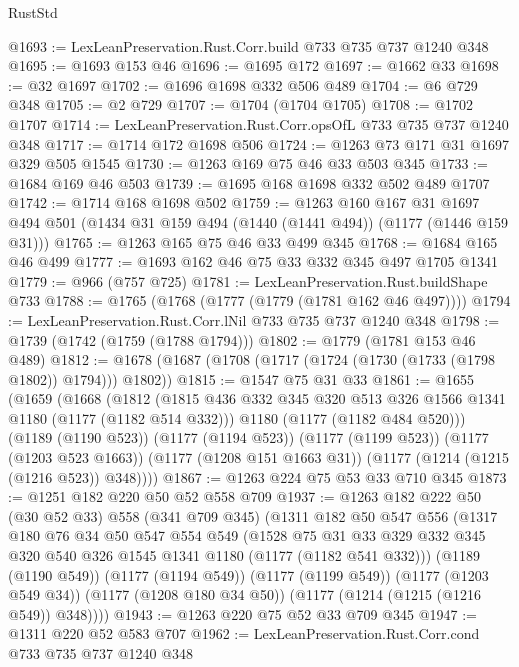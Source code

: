 \begin{lexlean}{RustStd}
\begin{coremodule}
@1693 := LexLeanPreservation.Rust.Corr.build @733 @735 @737 @1240 @348
@1695 := @1693 @153 @46
@1696 := @1695 @172
@1697 := @1662 @33
@1698 := @32 @1697
@1702 := @1696 @1698 @332 @506 @489
@1704 := @6 @729 @348
@1705 := @2 @729
@1707 := @1704 (@1704 @1705)
@1708 := @1702 @1707
@1714 := LexLeanPreservation.Rust.Corr.opsOfL @733 @735 @737 @1240 @348
@1717 := @1714 @172 @1698 @506
@1724 := @1263 @73 @171 @31 @1697 @329 @505 @1545
@1730 := @1263 @169 @75 @46 @33 @503 @345
@1733 := @1684 @169 @46 @503
@1739 := @1695 @168 @1698 @332 @502 @489 @1707
@1742 := @1714 @168 @1698 @502
@1759 := @1263
    @160
    @167
    @31
    @1697
    @494
    @501
    (@1434 @31 @159 @494 (@1440 (@1441 @494)) (@1177 (@1446 @159 @31)))
@1765 := @1263 @165 @75 @46 @33 @499 @345
@1768 := @1684 @165 @46 @499
@1777 := @1693 @162 @46 @75 @33 @332 @345 @497 @1705 @1341
@1779 := @966 (@757 @725)
@1781 := LexLeanPreservation.Rust.buildShape @733
@1788 := @1765 (@1768 (@1777 (@1779 (@1781 @162 @46 @497))))
@1794 := LexLeanPreservation.Rust.Corr.lNil @733 @735 @737 @1240 @348
@1798 := @1739 (@1742 (@1759 (@1788 @1794)))
@1802 := @1779 (@1781 @153 @46 @489)
@1812 := @1678 (@1687 (@1708 (@1717 (@1724 (@1730 (@1733 (@1798 @1802)) @1794))) @1802))
@1815 := @1547 @75 @31 @33
@1861 := @1655
    (@1659
      (@1668
        (@1812
          (@1815 @436 @332 @345 @320 @513 @326 @1566 @1341 @1180 (@1177 (@1182 @514 @332)))
          @1180
          (@1177 (@1182 @484 @520)))
        (@1189 (@1190 @523))
        (@1177 (@1194 @523))
        (@1177 (@1199 @523))
        (@1177 (@1203 @523 @1663))
        (@1177 (@1208 @151 @1663 @31))
        (@1177 (@1214 (@1215 (@1216 @523)) @348))))
@1867 := @1263 @224 @75 @53 @33 @710 @345
@1873 := @1251 @182 @220 @50 @52 @558 @709
@1937 := @1263
    @182
    @222
    @50
    (@30 @52 @33)
    @558
    (@341 @709 @345)
    (@1311
      @182
      @50
      @547
      @556
      (@1317
        @180
        @76
        @34
        @50
        @547
        @554
        @549
        (@1528
          @75
          @31
          @33
          @329
          @332
          @345
          @320
          @540
          @326
          @1545
          @1341
          @1180
          (@1177 (@1182 @541 @332)))
        (@1189 (@1190 @549))
        (@1177 (@1194 @549))
        (@1177 (@1199 @549))
        (@1177 (@1203 @549 @34))
        (@1177 (@1208 @180 @34 @50))
        (@1177 (@1214 (@1215 (@1216 @549)) @348))))
@1943 := @1263 @220 @75 @52 @33 @709 @345
@1947 := @1311 @220 @52 @583 @707
@1962 := LexLeanPreservation.Rust.Corr.cond
    @733
    @735
    @737
    @1240
    @348

\end{coremodule}
\end{lexlean}
